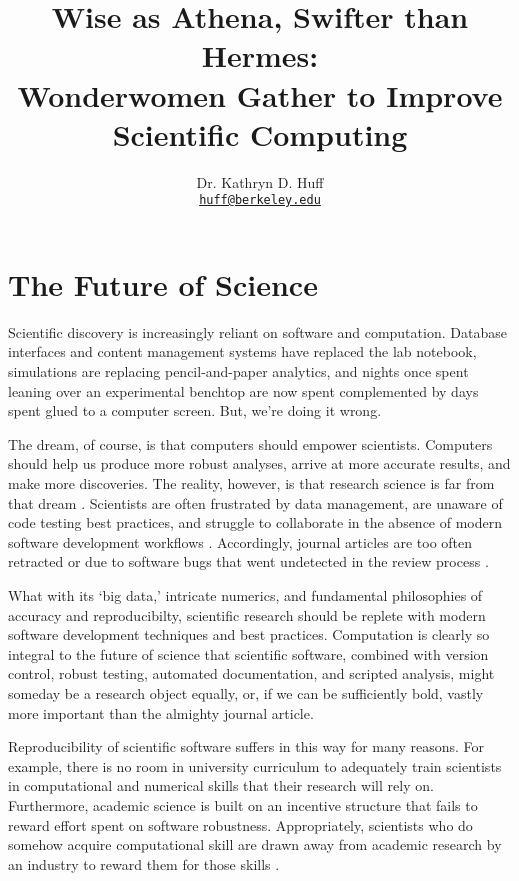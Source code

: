 \documentclass[letterpaper]{article}
\author{Dr. Kathryn D. Huff
  \\ \href{mailto:huff@berkeley.edu}{\texttt{huff@berkeley.edu}}
}
\date{}
\title{Wise as Athena, Swifter than Hermes:\\
Wonderwomen Gather to Improve Scientific Computing}
\begin{document}
\maketitle

\section*{The Future of Science}

Scientific discovery is increasingly reliant on 
software and computation. Database interfaces and content 
management systems have replaced the lab notebook, simulations are replacing 
pencil-and-paper analytics, and nights once spent leaning over an experimental 
benchtop are now spent complemented by days spent glued to a computer screen. 
But, we're doing it wrong. 

The dream, of course, is that computers should empower scientists. Computers 
should help us produce more robust analyses, arrive at more accurate results, 
and make more discoveries. 
The reality, however, is that research science is far from that dream 
\cite{hatton_t_1997,merali_computational_2010,joppa_troubling_2013} .  
Scientists are often frustrated by data management, are unaware of code testing 
best practices, and struggle to collaborate in the absence of modern software 
development workflows 
\cite{ackroyd_scientific_2008,segal_when_2005,hannay_how_2009,dubois_why_2003}.  
Accordingly, journal articles are too often retracted or due to software bugs that 
went undetected in the review process \cite{hypertension2012,chang2007,jaccretract2013,miller2006}.


What with its `big data,' intricate numerics, and 
fundamental philosophies of accuracy and reproducibilty,  scientific research 
should be replete with modern software development techniques and best 
practices.  Computation is clearly so integral to the future of science that 
scientific software, combined with version control, robust testing, automated 
documentation, and scripted analysis, might someday be a research object 
equally, or, if we can be sufficiently bold, vastly more important than the 
almighty journal article.

Reproducibility of scientific software suffers in this way for many reasons. For 
example, there is no room in university curriculum to adequately train 
scientists in computational and numerical skills that their research will rely 
on. Furthermore, academic science is built on an incentive structure that fails 
to reward effort spent on software robustness. Appropriately, scientists who do 
somehow acquire computational skill are drawn away from academic research by an 
industry to reward them for those skills \cite{vanderplas_big_2013}.  
\end{document}
